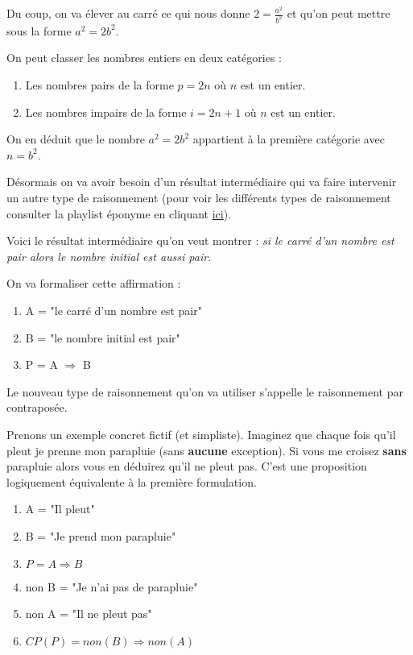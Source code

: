 \documentclass[a4paper, 11pt, twoside]{article}
\begin{document}
Du coup, on va élever au carré ce qui nous donne \(2 =
   \frac{a^2}{b^2}\) et qu'on peut mettre sous la forme \(a^2 = 2b^2\).

On peut classer les nombres entiers en deux catégories :
\begin{enumerate}
\item Les nombres pairs de la forme \(p = 2n\) où \(n\) est un entier.
\item Les nombres impairs de la forme \(i = 2n + 1\) où \(n\) est un
entier.
\end{enumerate}

On en déduit que le nombre \(a^2 = 2b^2\) appartient à la première
catégorie avec \(n = b^2\).

Désormais on va avoir besoin d'un résultat intermédiaire qui va
faire intervenir un autre type de raisonnement (pour voir les
différents types de raisonnement consulter la playlist éponyme en
cliquant \href{https://www.youtube.com/watch?v=R\_L4NEgIxPM\&list=PLwWStLtwGECb-3dJmBXOYc8oQw1mRsrep\&pp=iAQB}{ici}).

Voici le résultat intermédiaire qu'on veut montrer : \emph{si le carré
d'un nombre est pair alors le nombre initial est aussi pair}.

On va formaliser cette affirmation :
\begin{enumerate}
\item A = "le carré d'un nombre est pair"
\item B = "le nombre initial est pair"
\item P = A \(\Rightarrow\) B
\end{enumerate}

Le nouveau type de raisonnement qu'on va utiliser s'appelle le
raisonnement par contraposée.

Prenons un exemple concret fictif (et simpliste). Imaginez que
chaque fois qu'il pleut je prenne mon parapluie (sans \textbf{aucune}
exception). Si vous me croisez \textbf{sans} parapluie alors vous en
déduirez qu'il ne pleut pas. C'est une proposition logiquement
équivalente à la première formulation.

\begin{enumerate}
\item A = "Il pleut"
\item B = "Je prend mon parapluie"
\item \(P = A\Rightarrow B\)
\item non B = "Je n'ai pas de parapluie"
\item non A = "Il ne pleut pas"
\item \(CP(P) = non(B)\Rightarrow non(A)\)
\end{enumerate}
\end{document}
